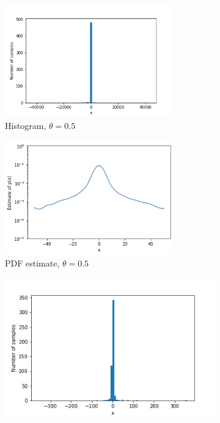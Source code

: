 \documentclass[a4paper]{article}
\begin{document}
\begin{figure}[H]
    \centering
    \begin{subfigure}[b]{0.45\textwidth}
        \centering
        \includegraphics[width=0.8\textwidth]{figures/gamma_sampled_gaussian_histogram_0.5.png}
        \caption{Histogram, $\theta = 0.5$}
        \label{fig:gamma_sampled_gaussian_histogram_0.5}
    \end{subfigure}
    \hfill
    \begin{subfigure}[b]{0.45\textwidth}
        \centering
        \includegraphics[width=0.8\textwidth]{figures/gamma_sampled_gaussian_smoothed_0.5.png}
        \caption{PDF estimate, $\theta = 0.5$}
        \label{fig:gamma_sampled_gaussian_smoothed_0.5}
    \end{subfigure}
    \begin{subfigure}[b]{0.45\textwidth}
        \centering
        \includegraphics[width=\textwidth]{figures/gamma_sampled_gaussian_histogram_1.png}

\end{subfigure}
\end{figure}
\end{document}
